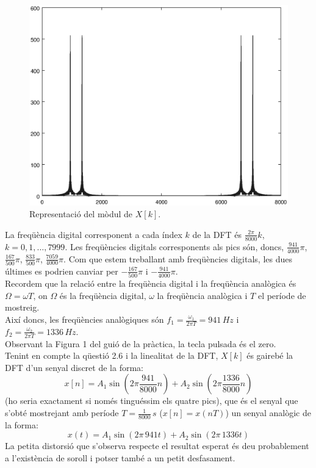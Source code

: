 \documentclass[11pt,a4]{article}
\numberwithin{equation}{section}
\theoremstyle{thmstyle}
\theoremstyle{thmstyle}
\theoremstyle{thmstyle}
\theoremstyle{thmstyle}
\theoremstyle{thmstyle}
\theoremstyle{thmstyle}
\theoremstyle{thmstyle}
\begin{document}
\begin{figure}
\includegraphics[scale=0.7]{moddft2.eps} 
\caption{Representació del mòdul de $X[k]$.}
\label{fig:moddft}
\end{figure}

La freqüència digital corresponent a cada índex $k$ de la DFT és $\frac{2\pi}{8000}k$, $k=0,1,\ldots, 7999$. Les freqüències digitals corresponents als pics són, doncs, $\frac{941}{4000}\pi$, $\frac{167}{500}\pi$, $\frac{833}{500}\pi$, $\frac{7059}{4000}\pi$. Com que estem treballant amb freqüències digitals, les dues últimes es podrien canviar per $-\frac{167}{500}\pi$ i $-\frac{941}{4000}\pi$.
\\

Recordem que la relació entre la freqüència digital i la freqüència analògica és $\Omega=\omega T$, on $\Omega$ és la freqüència digital, $\omega$ la freqüència analògica i $T$ el període de mostreig.
\\

Així doncs, les freqüències analògiques són $f_1=\frac{\omega_1}{2\pi T}=941\, Hz$  i $f_2=\frac{\omega_2}{2\pi T}=1336\, Hz$.
\\

Observant la Figura 1 del guió de la pràctica, la tecla pulsada és el zero.
\\

Tenint en compte la qüestió 2.6 i la linealitat de la DFT, $X[k]$ és gairebé la DFT d'un senyal discret de la forma:
$$
x[n] = A_1 \sin(2\pi\frac{941}{8000}n) + A_2 \sin(2\pi\frac{1336}{8000}n)
$$
(ho seria exactament si només tinguéssim els quatre pics), que és el senyal que s'obté mostrejant amb període $T=\frac{1}{8000}\,s$ ($x[n] = x(nT)$) un senyal analògic de la forma:
$$
x(t) = A_1 \sin(2\pi\, 941t) + A_2 \sin(2\pi\, 1336t)
$$
La petita distorsió que s'observa respecte el resultat esperat és deu probablement a l'existència de soroll i potser també a un petit desfasament.
\\
\end{document}
